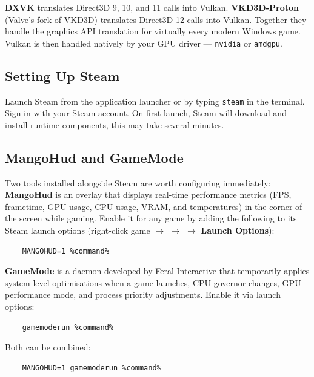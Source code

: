 \documentclass{article}
\newcommand{\code}[1]{\colorbox{codebg}{\texttt{#1}}}
\begin{document}
	
\begin{tcolorbox}[arc=12pt, outer arc=10pt,
	colback=blue!4!white, colframe=blue!40!black,
	title=\textbf{DXVK and VKD3D-Proton}]
	\textbf{DXVK} translates Direct3D 9, 10, and 11 calls into Vulkan.
	\textbf{VKD3D-Proton} (Valve's fork of VKD3D) translates Direct3D 12 calls into
	Vulkan. Together they handle the graphics API translation for virtually every
	modern Windows game. Vulkan is then handled natively by your GPU driver ---
	\code{nvidia} or \code{amdgpu}.
\end{tcolorbox}

\subsection{Setting Up Steam}

Launch Steam from the application launcher or by typing \code{steam} in the
terminal. Sign in with your Steam account. On first launch, Steam will download
and install runtime components, this may take several minutes.

\subsection{MangoHud and GameMode}

Two tools installed alongside Steam are worth configuring immediately: \textbf{MangoHud} is an overlay that displays real-time performance metrics (FPS, frametime, GPU usage, CPU usage, VRAM, and temperatures) in the corner
of the screen while gaming. Enable it for any game by adding the following to
its Steam launch options (right-click game $\rightarrow$ 
$\rightarrow$  $\rightarrow$ \textbf{Launch Options}):

\begin{verbatim}
	MANGOHUD=1 %command%
\end{verbatim}

\noindent \textbf{GameMode} is a daemon developed by Feral Interactive that temporarily
applies system-level optimisations when a game launches, CPU governor changes,
GPU performance mode, and process priority adjustments. Enable it via launch
options:

\begin{verbatim}
	gamemoderun %command%
\end{verbatim}

Both can be combined:

\begin{verbatim}
	MANGOHUD=1 gamemoderun %command%
\end{verbatim}
\end{document}

